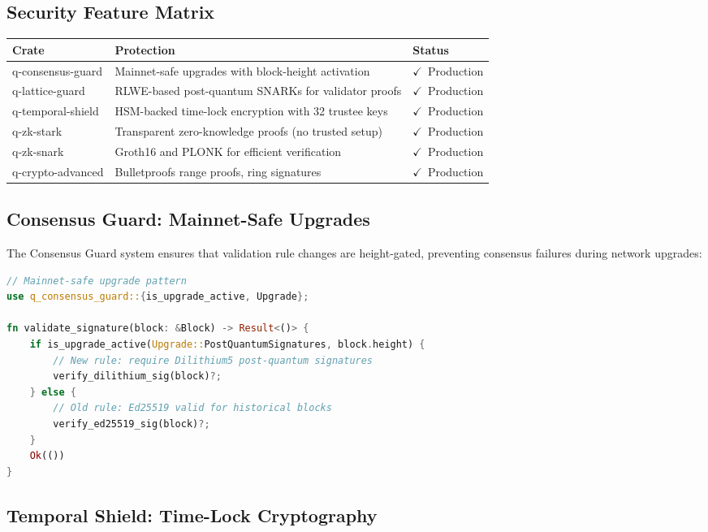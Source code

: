 \documentclass[12pt,a4paper]{article}
\newcommand{\faCheckCircle}{$\checkmark$}
\begin{document}
\subsection{Security Feature Matrix}

\begin{center}
\begin{tabular}{@{}lp{8cm}l@{}}
\toprule
\textbf{Crate} & \textbf{Protection} & \textbf{Status} \\
\midrule
q-consensus-guard & Mainnet-safe upgrades with block-height activation & \faCheckCircle\ Production \\
q-lattice-guard & RLWE-based post-quantum SNARKs for validator proofs & \faCheckCircle\ Production \\
q-temporal-shield & HSM-backed time-lock encryption with 32 trustee keys & \faCheckCircle\ Production \\
q-zk-stark & Transparent zero-knowledge proofs (no trusted setup) & \faCheckCircle\ Production \\
q-zk-snark & Groth16 and PLONK for efficient verification & \faCheckCircle\ Production \\
q-crypto-advanced & Bulletproofs range proofs, ring signatures & \faCheckCircle\ Production \\
\bottomrule
\end{tabular}
\end{center}

\subsection{Consensus Guard: Mainnet-Safe Upgrades}

The Consensus Guard system ensures that validation rule changes are height-gated, preventing consensus failures during network upgrades:

\begin{lstlisting}[language=Rust, caption={Height-Gated Upgrade Example}]
// Mainnet-safe upgrade pattern
use q_consensus_guard::{is_upgrade_active, Upgrade};

fn validate_signature(block: &Block) -> Result<()> {
    if is_upgrade_active(Upgrade::PostQuantumSignatures, block.height) {
        // New rule: require Dilithium5 post-quantum signatures
        verify_dilithium_sig(block)?;
    } else {
        // Old rule: Ed25519 valid for historical blocks
        verify_ed25519_sig(block)?;
    }
    Ok(())
}
\end{lstlisting}

\subsection{Temporal Shield: Time-Lock Cryptography}
\end{document}
